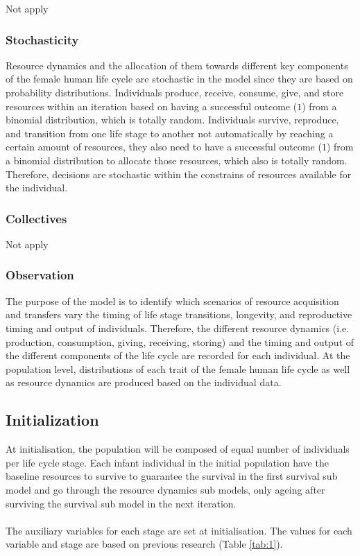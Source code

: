 \documentclass{article}
\begin{document}
Not apply

\subsubsection{Stochasticity}

Resource dynamics and the allocation of them towards different key components of the female human life cycle are stochastic in the model since they are based on probability distributions. Individuals produce, receive, consume, give, and store resources within an iteration based on having a successful outcome ($1$) from a binomial distribution, which is totally random. Individuals survive, reproduce, and transition from one life stage to another not automatically by reaching a certain amount of resources, they also need to have a successful outcome ($1$) from a binomial distribution to allocate those resources, which also is totally random. Therefore, decisions are stochastic within the constrains of resources available for the individual.

\subsubsection{Collectives}

Not apply

\subsubsection{Observation}

The purpose of the model is to identify which scenarios of resource acquisition and transfers vary the timing of life stage transitions, longevity, and reproductive timing and output of individuals. Therefore, the different resource dynamics (i.e. production, consumption, giving, receiving, storing) and the timing and output of the different components of the life cycle are recorded for each individual. At the population level, distributions of each trait of the female human life cycle as well as resource dynamics are produced based on the individual data.

\subsection{Initialization}

At initialisation, the population will be composed of equal number of individuals per life cycle stage. Each infant individual in the initial population have the baseline resources to survive to guarantee the survival in the first survival sub model and go through the resource dynamics sub models, only ageing after surviving the survival sub model in the next iteration.
\\\\
The auxiliary variables for each stage are set at initialisation. The values for each variable and stage are based on previous research (Table \ref{tab:1}).
\end{document}
